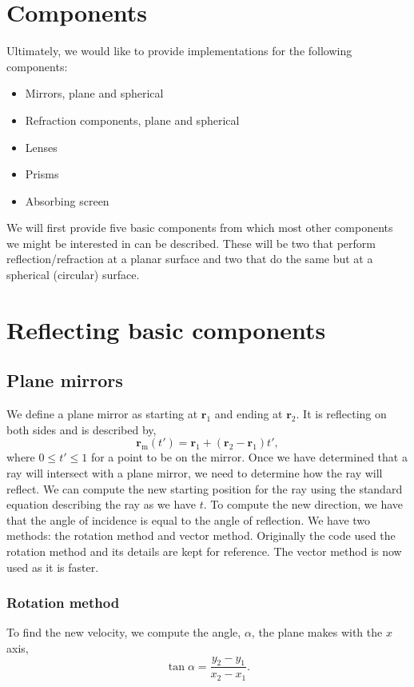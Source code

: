 \documentclass{article}
\let\vec \bm
\begin{document}
\section{Components}
Ultimately, we would like to provide implementations for the following components:
\begin{itemize}
    \item Mirrors, plane and spherical
    \item Refraction components, plane and spherical
    \item Lenses
    \item Prisms
    \item Absorbing screen
\end{itemize}
We will first provide five basic components from which most other components we might be interested in can be described. These will be two that perform reflection/refraction at a planar surface and two that do the same but at a spherical (circular) surface.

\section{Reflecting basic components}
\subsection{Plane mirrors}
We define a plane mirror as starting at $\vec{r}_1$ and ending at $\vec{r}_2$. It is reflecting on both sides and is described by,
\begin{equation}
    \vec{r}_\mathrm{m}(t')
    =
    \vec{r}_1 + (\vec{r}_2 - \vec{r}_1) t',
\end{equation}
where $0 \le t' \le 1$ for a point to be on the mirror. Once we have determined that a ray will intersect with a plane mirror, we need to determine how the ray will reflect. We can compute the new starting position for the ray using the standard equation describing the ray as we have $t$. To compute the new direction, we have that the angle of incidence is equal to the angle of reflection. We have two methods: the rotation method and vector method. Originally the code used the rotation method and its details are kept for reference. The vector method is now used as it is faster.

\subsubsection{Rotation method}
To find the new velocity, we compute the angle, $\alpha$, the plane makes with the $x$ axis,
\begin{equation}
    \label{eq:plane_angle}
    \tan \alpha
    =
    \frac{y_2 - y_1}{x_2 - x_1}.
\end{equation}
\end{document}
